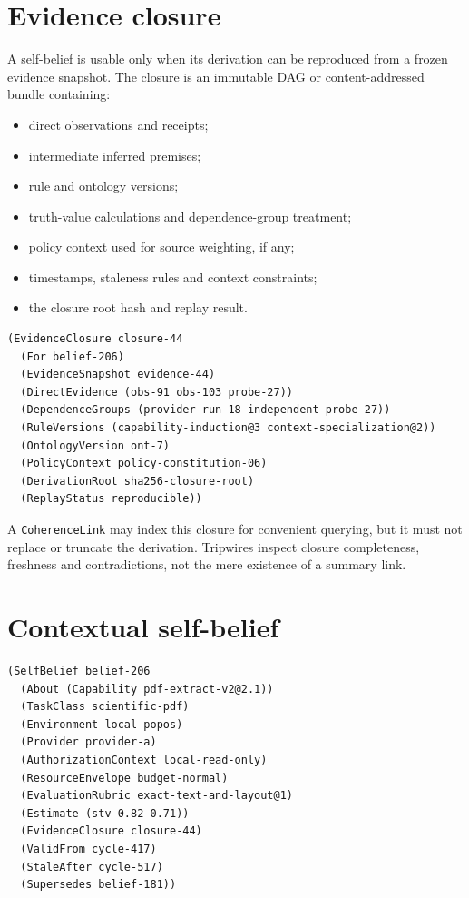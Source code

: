 \documentclass[11pt,oneside]{report}
\begin{document}
\section{Evidence closure}

A self-belief is usable only when its derivation can be reproduced from a frozen evidence snapshot. The closure is an immutable DAG or content-addressed bundle containing:

\begin{itemize}
  \item direct observations and receipts;
  \item intermediate inferred premises;
  \item rule and ontology versions;
  \item truth-value calculations and dependence-group treatment;
  \item policy context used for source weighting, if any;
  \item timestamps, staleness rules and context constraints;
  \item the closure root hash and replay result.
\end{itemize}

\begin{lstlisting}[language=Metta,caption={MeTTa-shaped evidence closure}]
(EvidenceClosure closure-44
  (For belief-206)
  (EvidenceSnapshot evidence-44)
  (DirectEvidence (obs-91 obs-103 probe-27))
  (DependenceGroups (provider-run-18 independent-probe-27))
  (RuleVersions (capability-induction@3 context-specialization@2))
  (OntologyVersion ont-7)
  (PolicyContext policy-constitution-06)
  (DerivationRoot sha256-closure-root)
  (ReplayStatus reproducible))
\end{lstlisting}

A \texttt{CoherenceLink} may index this closure for convenient querying, but it must not replace or truncate the derivation. Tripwires inspect closure completeness, freshness and contradictions, not the mere existence of a summary link.

\section{Contextual self-belief}

\begin{lstlisting}[language=Metta,caption={Context-keyed capability belief}]
(SelfBelief belief-206
  (About (Capability pdf-extract-v2@2.1))
  (TaskClass scientific-pdf)
  (Environment local-popos)
  (Provider provider-a)
  (AuthorizationContext local-read-only)
  (ResourceEnvelope budget-normal)
  (EvaluationRubric exact-text-and-layout@1)
  (Estimate (stv 0.82 0.71))
  (EvidenceClosure closure-44)
  (ValidFrom cycle-417)
  (StaleAfter cycle-517)
  (Supersedes belief-181))
\end{lstlisting}
\end{document}
